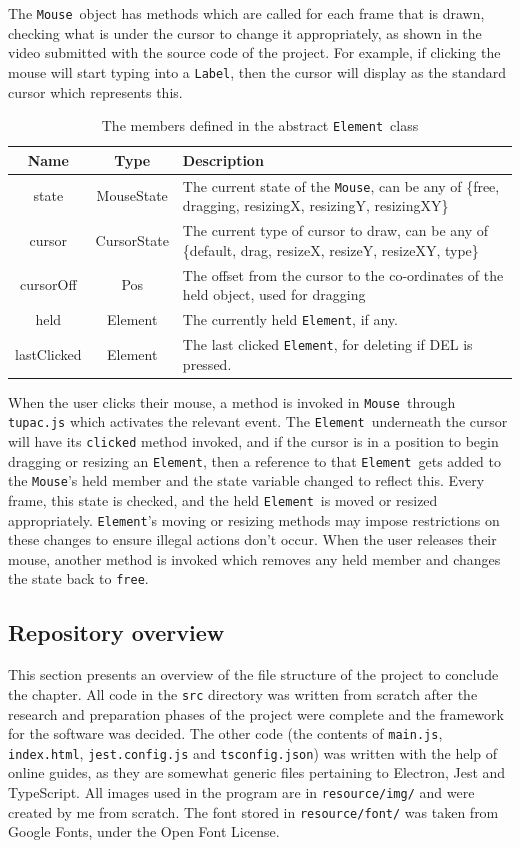 \documentclass[12pt,a4paper,oneside,openright]{report}
\newcommand{\element}{\texttt{Element}}
\newcommand{\mouse}{\texttt{Mouse}}
\newcommand{\labelT}{\texttt{Label}}
\begin{document}
The \mouse\ object has methods which are called for each frame that is drawn, checking what is under the cursor to change it appropriately, as shown in the video submitted with the source code of the project. For example, if clicking the mouse will start typing into a \labelT, then the cursor will display as the standard cursor which represents this. 

\begin{table}[h]
    \centering
    \begin{tabular}{c|c|p{300pt}}
        Name & Type & Description \\
        \hline
        state & MouseState & The current state of the \mouse, can be any of \{free, dragging, resizingX, resizingY, resizingXY\}\\
        cursor & CursorState & The current type of cursor to draw, can be any of \{default, drag, resizeX, resizeY, resizeXY, type\}\\
        cursorOff & Pos & The offset from the cursor to the co-ordinates of the held object, used for dragging\\
        held & Element & The currently held \element, if any.\\
        lastClicked & Element & The last clicked \element, for deleting if DEL is pressed.\\
    \end{tabular}
    \caption{The members defined in the abstract \element\ class}
    \label{tab:element_members}
\end{table}

When the user clicks their mouse, a method is invoked in \mouse\ through \verb|tupac.js| which activates the relevant event. The \element\ underneath the cursor will have its \verb|clicked| method invoked, and if the cursor is in a position to begin dragging or resizing an \element, then a reference to that \element\ gets added to the \mouse's held member and the state variable changed to reflect this. Every frame, this state is checked, and the held \element\ is moved or resized appropriately. \element's moving or resizing methods may impose restrictions on these changes to ensure illegal actions don't occur. When the user releases their mouse, another method is invoked which removes any held member and changes the state back to \verb|free|.

\clearpage
\subsection{Repository overview}
This section presents an overview of the file structure of the project to conclude the chapter. All code in the \verb|src| directory was written from scratch after the research and preparation phases of the project were complete and the framework for the software was decided. The other code (the contents of \verb|main.js|, \verb|index.html|, \verb|jest.config.js| and \verb|tsconfig.json|) was written with the help of online guides, as they are somewhat generic files pertaining to Electron, Jest and TypeScript. All images used in the program are in \verb|resource/img/| and were created by me from scratch. The font stored in \verb|resource/font/| was taken from Google Fonts, under the Open Font License.
\end{document}
